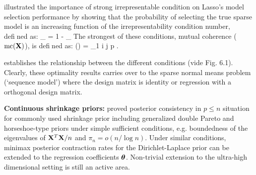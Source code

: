 \documentclass[sts,preprint]{imsart}
\begin{document}
\citet{zhao2006model} illustrated the importance of strong irrepresentable condition on Lasso's model selection performance by showing that the probability of selecting the true sparse model is an increasing function of the irrepresentability condition number, defined as:
\beq
\eta_{\infty} = 1 - _{\infty} \label{eq:eta_infty}
\eeq
The strongest of these conditions, mutual coherence ($\text{mc}({\bf X})$), is defined as:
\beq
{}(\X) = \max_{1 \le i \ne j \le p} .
\label{eq:mc}
\eeq

\cite{buhlmann2011statistics} establishes the relationship between the different conditions (vide Fig. 6.1). Clearly, these optimality results carries over to the sparse normal means problem (`sequence model') where the design matrix is identity or regression with a orthogonal design matrix.

\noindent \textbf{Continuous shrinkage priors:} \cite{armagan2013posterior} proved posterior consistency in $p \le n$ situation for commonly used shrinkage prior including generalized double Pareto and horseshoe-type priors under simple sufficient conditions, e.g. boundedness of the eigenvalues of ${\bf X}^T{\bf X}/n$ and $\pi_n = o(n/\log n)$. Under similar conditions, minimax posterior contraction rates for the Dirichlet-Laplace prior \citep{bhattacharya2014dirichlet} can be extended to the regression coefficients $\boldsymbol{\theta}$. Non-trivial extension to the ultra-high dimensional setting is still an active area. 
\end{document}
